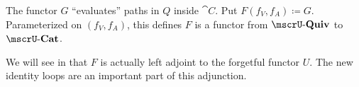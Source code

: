 \begin{definition}
  The functor \( G \) \enquote{evaluates} paths in \( Q \) inside \( \cat{C} \). Put \( F(f_V, f_A) \coloneqq G \). Parameterized on \( (f_V, f_A) \), this defines \( F \) is a functor from \( \ucat{Quiv} \) to \( \ucat{Cat} \).

  We will see in  that \( F \) is actually left adjoint to the forgetful functor \( U \). The new identity loops are an important part of this adjunction.
\end{definition}
